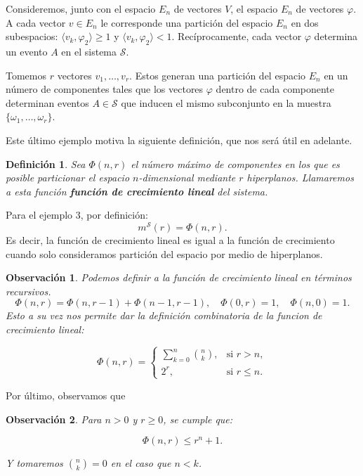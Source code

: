 \documentclass{report}
\newtheorem{dfn}{Definición}[section]
\newtheorem{obs}{Observación}[section]
\begin{document}
Consideremos, junto con el espacio \( E_n \) de vectores \( V \), el espacio \( E_n \)
de vectores \( \varphi \). A cada vector \( v \in E_n \) le corresponde una partición
del espacio \( E_n \) en dos subespacios: \(\langle v_k, \varphi_2 \rangle \geq 1\) y \(\langle v_k, \varphi_2 \rangle < 1\).
Recíprocamente, cada vector \(\varphi\) determina un evento $A$ en el sistema \(\mathcal{S}\).

Tomemos \( r \) vectores \( v_1, \dots, v_r \). Estos generan una partición del espacio \( E_n \)
en un número de componentes tales que los vectores \( \varphi \) dentro de cada componente determinan eventos
\( A \in \mathcal{S} \) que inducen el mismo subconjunto en la muestra \( \{\omega_1, \dots, \omega_r \}\).

Este último ejemplo motiva la siguiente definición, que nos será útil en adelante.

\begin{dfn}
    Sea \( \Phi(n, r) \) el número máximo de componentes en los que es posible particionar el espacio \( n \)-dimensional
mediante \( r \) hiperplanos. Llamaremos a esta función \textbf{función de crecimiento lineal} del sistema.
\end{dfn}


Para el ejemplo 3, por definición:
\[
    m^{\mathcal{S}}(r) = \Phi(n, r).
\]
Es decir, la función de crecimiento lineal es igual a la función de crecimiento cuando solo consideramos partición
del espacio por medio de hiperplanos.

\begin{obs}
Podemos definir a la función de crecimiento lineal en términos recursivos.
\[
    \Phi(n, r) = \Phi(n, r - 1) + \Phi(n - 1, r - 1),\quad \Phi(0, r) = 1, \quad \Phi(n, 0) = 1.
\]
Esto a su vez nos permite dar la definición combinatoria de la funcion de crecimiento lineal:

\begin{equation}
\Phi(n, r) =
\begin{cases}
\sum\limits_{k=0}^{n} \binom{n}{k}, & \text{si } r > n, \\
2^r, & \text{si } r \leq n.
\end{cases}
\label{def: combinatoria función crecimiento lineal}
\end{equation}
\end{obs}

Por último, observamos que

\begin{obs}
Para \( n > 0 \) y \( r \geq 0 \), se cumple que:

\[
\Phi(n, r) \leq r^n + 1.
\]

Y tomaremos \( \binom{n}{k} = 0 \) en el caso que \( n < k \).
\end{obs}
\end{document}
